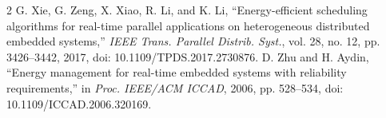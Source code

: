 \documentclass[10pt,twocolumn]{article}
\begin{document}
\begin{thebibliography}{2}
G. Xie, G. Zeng, X. Xiao, R. Li, and K. Li,
``Energy-efficient scheduling algorithms for real-time parallel
applications on heterogeneous distributed embedded systems,''
\emph{IEEE Trans. Parallel Distrib. Syst.}, vol. 28, no. 12,
pp. 3426--3442, 2017, doi: 10.1109/TPDS.2017.2730876.
D. Zhu and H. Aydin, ``Energy management for real-time embedded systems
with reliability requirements,'' in \emph{Proc. IEEE/ACM ICCAD},
2006, pp. 528--534, doi: 10.1109/ICCAD.2006.320169.
\end{thebibliography}
\end{document}

